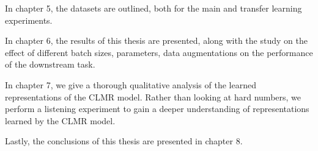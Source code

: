In chapter 5, the datasets are outlined, both for the main and transfer learning experiments.

In chapter 6, the results of this thesis are presented, along with the study on the effect of different batch sizes, parameters, data augmentations on the performance of the downstream task.

In chapter 7, we give a thorough qualitative analysis of the learned representations of the CLMR model. Rather than looking at hard numbers, we perform a listening experiment to gain a deeper understanding of representations learned by the CLMR model.

Lastly, the conclusions of this thesis are presented in chapter 8.

